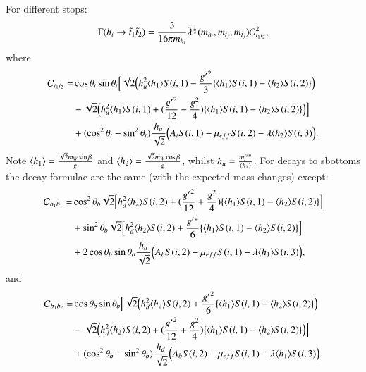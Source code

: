 \documentclass[final,3p,times,pdflatex]{elsarticle}
\begin{document}
For different stops:
\begin{equation} \label{hst1st2NMSSM}
\Gamma( h_{i} \rightarrow \tilde{t}_{1} \tilde{t}_{2} ) = {3 \over 16\pi m_{h_i}} \tilde{\lambda}^{1 \over 2}(m_{{h}_i},m_{\tilde{t}_j},m_{\tilde{t}_j})\mathcal{C}_{t_{1}t_{2}}^2,
\end{equation}
where
\begin{equation}
\begin{aligned}
\mathcal{C}_{t_{1}t_{2}} = & \cos\theta_t \sin\theta_t \Big[\sqrt{2} \Big(h_{u}^2 \langle h_{1} \rangle S(i,1) - {{g'}^2 \over 3}\{\langle h_{1} \rangle S(i,1) - \langle h_{2} \rangle S(i,2)\}\Big) \\ & - \sqrt{2}\Big(h_{u}^2 \langle h_{1} \rangle S(i,1)  + ({{g'}^2 \over 12} - {g^2 \over 4})\{\langle h_{1} \rangle S(i,1) - \langle h_{2} \rangle S(i,2)\}\Big)\Big] \\ & + (\cos^2 \theta_t - \sin^2 \theta_t) {h_{u} \over \sqrt{2}} \Big(A_{t} S(i,1) - \mu_{eff} S(i,2) - \lambda \langle h_{2} \rangle S(i,3)\Big).
\end{aligned}
\end{equation}
Note $\langle h_{1} \rangle = {\sqrt{2} m_{W} \sin\beta \over g}$ and $\langle h_{2} \rangle = {\sqrt{2} m_{W} \cos\beta \over g}$, whilst $h_{u} = {m_{t}^{run} \over \langle h_{1} \rangle}$. \label{vevsh}
For decays to sbottoms the decay formulae are the same (with the expected mass changes) except:
\begin{equation}
\begin{aligned}
\mathcal{C}_{b_{1}b_{1}} = & \cos^2\theta_b \sqrt{2}\Big[h_{d}^2 \langle h_{2} \rangle S(i,2) + ({{g'}^{2} \over 12} + {g^2 \over 4})\{\langle h_{1} \rangle S(i,1) - \langle h_{2} \rangle S(i,2)\}\Big] \\ & + \sin^2 \theta_b \sqrt{2} \Big[h_{d}^2 \langle h_{2} \rangle S(i,2) + {{g'}^2 \over 6}\{\langle h_{1} \rangle S(i,1) - \langle h_{2} \rangle S(i,2)\}\Big] \\ & + 2\cos\theta_b \sin\theta_b {h_{d} \over \sqrt{2}}\Big(A_b S(i,2) - \mu_{eff} S(i,1) - \lambda \langle h_{1} \rangle S(i,3)\Big),
\end{aligned}
\end{equation}
and
\begin{equation}
\begin{aligned}
\mathcal{C}_{b_{1}b_{2}} = & \cos\theta_b \sin\theta_b \Big[\sqrt{2} \Big(h_{d}^2 \langle h_{2} \rangle S(i,2) + {{g'}^2 \over 6}\{\langle h_{1} \rangle S(i,1) - \langle h_{2} \rangle S(i,2)\}\Big) \\ & - \sqrt{2}\Big(h_{d}^2 \langle h_{2} \rangle S(i,2)  + ({{g'}^2 \over 12} + {g^2 \over 4})\{\langle h_{1} \rangle S(i,1) - \langle h_{2} \rangle S(i,2)\}\Big)\Big] \\ & + (\cos^2 \theta_b - \sin^2 \theta_b) {h_{d} \over \sqrt{2}} \Big(A_{b} S(i,2) - \mu_{eff} S(i,1) - \lambda \langle h_{1} \rangle S(i,3)\Big).
\end{aligned}
\end{equation}
\end{document}
